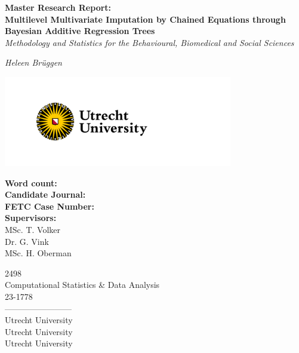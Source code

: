 \documentclass[10pt, a4paper, titlepage]{article}
\begin{document}
\begin{titlingpage}
\begin{center}
\Huge\textbf{Master Research Report:  \\ Multilevel Multivariate Imputation by Chained Equations through Bayesian Additive Regression Trees} \\
\Large\textit{Methodology and Statistics for the Behavioural, Biomedical and Social Sciences}

\vspace{.5cm}

\normalsize\textit{Heleen Brüggen}

\vspace{11.5cm}

\begin{minipage}{.5\textwidth}
\begin{center}
        \includegraphics[width=10cm]{graphs/UU_logo_2021_EN_RGB.png}
\end{center}
\end{minipage}%

\vspace{.25cm}

\begin{minipage}{0.5\textwidth}
\begin{flushleft}

\textbf{Word count:} \\
\textbf{Candidate Journal:} \\
\textbf{FETC Case Number:} \\
\textbf{Supervisors:} \\
MSc. T. Volker \\
Dr. G. Vink \\
MSc. H. Oberman
\end{flushleft}
\end{minipage}%
\begin{minipage}{0.5\textwidth}
\begin{flushright}

2498 \\
Computational Statistics \& Data Analysis \\
23-1778 \\
------------------------\\
Utrecht University \\
Utrecht University \\
Utrecht University
\end{flushright}
\end{minipage}

\end{center}
\end{titlingpage}
\end{document}
